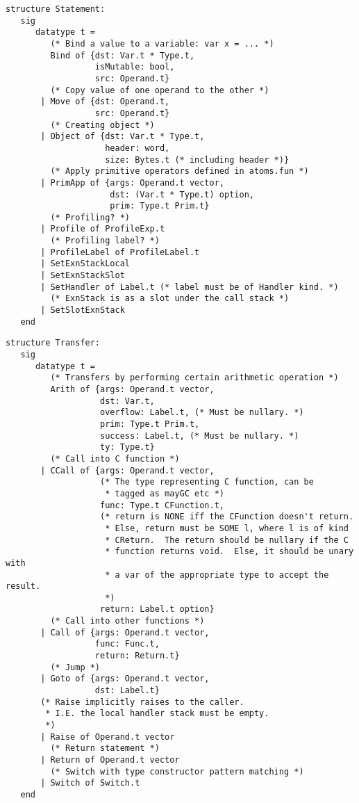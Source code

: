 \begin{verbatim}
structure Statement:
   sig
      datatype t =
         (* Bind a value to a variable: var x = ... *)
         Bind of {dst: Var.t * Type.t,
                  isMutable: bool,
                  src: Operand.t}
         (* Copy value of one operand to the other *)
       | Move of {dst: Operand.t,
                  src: Operand.t}
         (* Creating object *)
       | Object of {dst: Var.t * Type.t,
                    header: word,
                    size: Bytes.t (* including header *)}
         (* Apply primitive operators defined in atoms.fun *)
       | PrimApp of {args: Operand.t vector,
                     dst: (Var.t * Type.t) option,
                     prim: Type.t Prim.t}
         (* Profiling? *)
       | Profile of ProfileExp.t
         (* Profiling label? *)
       | ProfileLabel of ProfileLabel.t
       | SetExnStackLocal
       | SetExnStackSlot
       | SetHandler of Label.t (* label must be of Handler kind. *)
         (* ExnStack is as a slot under the call stack *)
       | SetSlotExnStack
   end
\end{verbatim}


\begin{verbatim}
structure Transfer:
   sig
      datatype t =
         (* Transfers by performing certain arithmetic operation *)
         Arith of {args: Operand.t vector,
                   dst: Var.t,
                   overflow: Label.t, (* Must be nullary. *)
                   prim: Type.t Prim.t,
                   success: Label.t, (* Must be nullary. *)
                   ty: Type.t}
         (* Call into C function *)
       | CCall of {args: Operand.t vector,
                   (* The type representing C function, can be
                    * tagged as mayGC etc *)
                   func: Type.t CFunction.t,
                   (* return is NONE iff the CFunction doesn't return.
                    * Else, return must be SOME l, where l is of kind
                    * CReturn.  The return should be nullary if the C
                    * function returns void.  Else, it should be unary with
                    * a var of the appropriate type to accept the result.
                    *)
                   return: Label.t option}
         (* Call into other functions *)
       | Call of {args: Operand.t vector,
                  func: Func.t,
                  return: Return.t}
         (* Jump *)
       | Goto of {args: Operand.t vector,
                  dst: Label.t}
       (* Raise implicitly raises to the caller.
        * I.E. the local handler stack must be empty.
        *)
       | Raise of Operand.t vector
         (* Return statement *)
       | Return of Operand.t vector
         (* Switch with type constructor pattern matching *)
       | Switch of Switch.t
   end
\end{verbatim}

